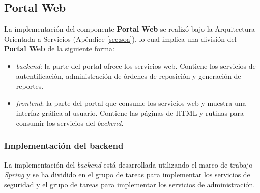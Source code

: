 \subsection{Portal Web}\label{sec:web-portal}
La implementación del componente \textbf{Portal Web} se realizó bajo la Arquitectura Orientada a Servicios (Apéndice \ref{sec:soa}), lo cual implica una división del \textbf{Portal Web} de la siguiente forma:
\begin{itemize}
	\item \textit{backend}: la parte del portal ofrece los servicios web. Contiene los servicios de autentificación, administración de órdenes de reposición y generación de reportes.
	\item \textit{frontend}: la parte del portal que consume los servicios web y muestra una interfaz gráfica al usuario. Contiene las páginas de HTML y rutinas para consumir los servicios del \textit{backend}.
\end{itemize}
\subsubsection{Implementación del backend}\label{sec:backend}
La implementación del \textit{backend} está desarrollada utilizando el marco de trabajo \textit{Spring} y se ha dividido en el grupo de tareas para implementar los servicios de seguridad y el grupo de tareas para implementar los servicios de administración.
